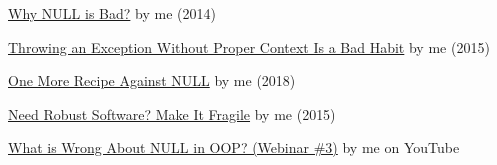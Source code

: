 \documentclass{article}
\begin{document}




\href{https://www.yegor256.com/2014/05/13/why-null-is-bad.html}{Why NULL is Bad?} by me (2014)

\href{https://www.yegor256.com/2015/12/01/rethrow-exceptions.html}{Throwing an Exception Without Proper Context Is a Bad Habit} by me (2015)

\href{https://www.yegor256.com/2018/05/22/default-arguments-against-null.html}{One More Recipe Against NULL} by me (2018)

\href{https://www.yegor256.com/2015/08/25/fail-fast.html}{Need Robust Software? Make It Fragile} by me (2015)

\href{https://www.youtube.com/watch?v=o3aNJX7AP3M}{What is Wrong About NULL in OOP? (Webinar \#3)} by me on YouTube
\end{document}
